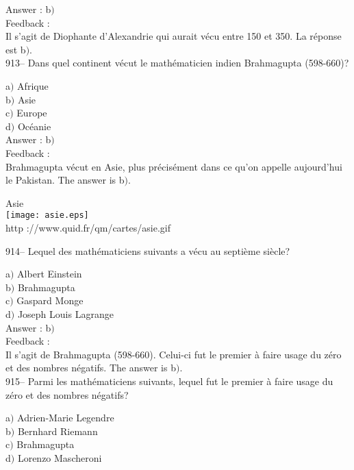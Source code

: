 \documentclass[letterpaper, 12pt]{article}
\begin{document}
Answer : b$)$\\

Feedback :\\
Il s'agit de Diophante d'Alexandrie qui aurait v\'ecu entre 150 et 350. La
r\'eponse est b$)$.\\

913-- Dans quel continent v\'ecut le math\'ematicien indien
Brahmagupta (598-660)?

a$)$ Afrique \\
b$)$ Asie \\
c$)$ Europe \\
d$)$ Oc\'eanie  \\

Answer : b$)$\\

Feedback : \\
Brahmagupta v\'ecut en Asie, plus pr\'ecis\'ement dans ce qu'on appelle
aujourd'hui le Pakistan. The answer is b$)$.\\

        \begin{center}
        Asie\\
    \texttt{[image: asie.eps]}\\
        {\footnotesize http ://www.quid.fr/qm/cartes/asie.gif}
    \end{center}

914-- Lequel des math\'ematiciens suivants a v\'ecu au septi\`eme
si\`ecle?

a$)$ Albert Einstein \\
b$)$ Brahmagupta \\
c$)$ Gaspard Monge \\
d$)$ Joseph Louis Lagrange\\

Answer : b$)$\\

Feedback : \\
Il s'agit de Brahmagupta (598-660). Celui-ci fut le premier \`a faire usage
du z\'ero et des nombres n\'egatifs. The answer is b$)$.\\

915-- Parmi les math\'ematiciens suivants, lequel fut le premier \`a
faire usage du z\'ero et des nombres n\'egatifs?

a$)$ Adrien-Marie Legendre  \\
b$)$ Bernhard Riemann \\
c$)$ Brahmagupta \\
d$)$ Lorenzo Mascheroni \\
\end{document}
